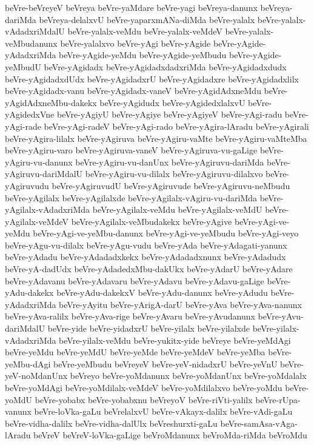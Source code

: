 {beVre-beVreyeV
beVreya
beVre-yaMdare
beVre-yagi
beVreya-danunx
beVreya-dariMda
beVreya-delalxvU
beVre-yaparxmANa-diMda
beVre-yalalx
beVre-yalalx-vAdadxriMdalU
beVre-yalalx-veMdu
beVre-yalalx-veMdeV
beVre-yalalx-veMbudanunx
beVre-yalalxvo
beVre-yAgi
beVre-yAgide
beVre-yAgide-yAdadxriMda
beVre-yAgide-yeMdu
beVre-yAgide-yeMbudu
beVre-yAgide-yeMbudU
beVre-yAgidadx
beVre-yAgidadxdadxriMda
beVre-yAgidadxdudx
beVre-yAgidadxdUdx
beVre-yAgidadxrU
beVre-yAgidadxre
beVre-yAgidadxlilx
beVre-yAgidadx-vanu
beVre-yAgidadx-vaneV
beVre-yAgidAdxneMdu
beVre-yAgidAdxneMbu-dakekx
beVre-yAgidudx
beVre-yAgidedxlalxvU
beVre-yAgidedxVne
beVre-yAgiyU
beVre-yAgiye
beVre-yAgiyeV
beVre-yAgi-radu
beVre-yAgi-rade
beVre-yAgi-radeV
beVre-yAgi-rado
beVre-yAgira-lAradu
beVre-yAgirali
beVre-yAgira-lilalx
beVre-yAgiruva
beVre-yAgiru-vaMte
beVre-yAgiru-vaMteMba
beVre-yAgiru-varo
beVre-yAgiruva-vaneV
beVre-yAgiruva-vu-gaLige
beVre-yAgiru-vu-danunx
beVre-yAgiru-vu-danUnx
beVre-yAgiruvu-dariMda
beVre-yAgiruvu-dariMdalU
beVre-yAgiru-vu-dilalx
beVre-yAgiruvu-dilalxvo
beVre-yAgiruvudu
beVre-yAgiruvudU
beVre-yAgiruvude
beVre-yAgiruvu-neMbudu
beVre-yAgilalx
beVre-yAgilalxde
beVre-yAgilalx-vAgiru-vu-dariMda
beVre-yAgilalx-vAdadxriMda
beVre-yAgilalx-veMdu
beVre-yAgilalx-veMdU
beVre-yAgilalx-veMdeV
beVre-yAgilalx-veMbudakekx
beVre-yAgive
beVre-yAgi-ve-yeMdu
beVre-yAgi-ve-yeMbu-danunx
beVre-yAgi-ve-yeMbudu
beVre-yAgi-veyo
beVre-yAgu-vu-dilalx
beVre-yAgu-vudu
beVre-yAda
beVre-yAdagati-yanunx
beVre-yAdadu
beVre-yAdadadxkekx
beVre-yAdadadxnunx
beVre-yAdadudx
beVre-yA-dadUdx
beVre-yAdadedxMbu-dakUkx
beVre-yAdarU
beVre-yAdare
beVre-yAdavanu
beVre-yAdavaru
beVre-yAdavu
beVre-yAdavu-gaLige
beVre-yAdu-dakekx
beVre-yAdu-dakekxV
beVre-yAdu-danunx
beVre-yAdudu
beVre-yAdadxriMda
beVre-yAyitu
beVre-yArigA-darU
beVre-yAva
beVre-yAva-nanunx
beVre-yAva-ralilx
beVre-yAva-rige
beVre-yAvaru
beVre-yAvudanunx
beVre-yAvu-dariMdalU
beVre-yide
beVre-yidadxrU
beVre-yilalx
beVre-yilalxde
beVre-yilalx-vAdadxriMda
beVre-yilalx-veMdu
beVre-yukitx-yide
beVreye
beVre-yeMdAgi
beVre-yeMdu
beVre-yeMdU
beVre-yeMde
beVre-yeMdeV
beVre-yeMba
beVre-yeMbu-dAgi
beVre-yeMbudu
beVreyeV
beVre-yeV-nidadxrU
beVre-yeVnU
beVre-yeV-noMdanUnx
beVreyo
beVre-yoMdanunx
beVre-yoMdanUnx
beVre-yoMdalalx
beVre-yoMdAgi
beVre-yoMdilalx-veMdeV
beVre-yoMdilalxvo
beVre-yoMdu
beVre-yoMdU
beVre-yobabx
beVre-yobabxnu
beVreyoV
beVre-riVti-yalilx
beVre-rUpa-vanunx
beVre-loVka-gaLu
beVrelalxvU
beVre-vAkayx-dalilx
beVre-vAdi-gaLu
beVre-vidha-dalilx
beVre-vidha-dalUlx
beVreshurxti-gaLu
beVre-samAsa-vAga-lAradu
beVreV
beVreV-loVka-gaLige
beVroMdanunx
beVroMda-riMda
beVroMdu
}
